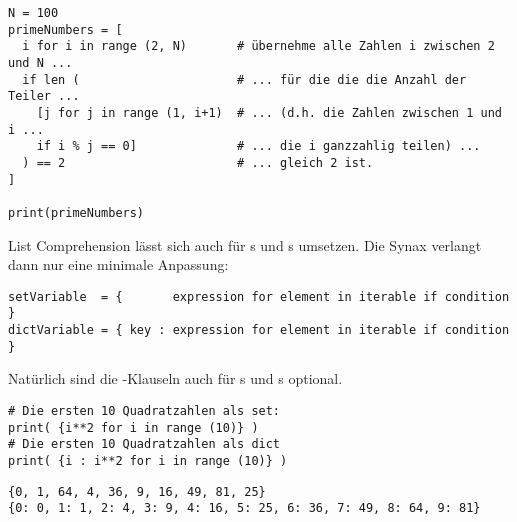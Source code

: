 \begin{codebox}
\begin{verbatim}
N = 100
primeNumbers = [
  i for i in range (2, N)       # übernehme alle Zahlen i zwischen 2 und N ...
  if len (                      # ... für die die die Anzahl der Teiler ...
    [j for j in range (1, i+1)  # ... (d.h. die Zahlen zwischen 1 und i ...
    if i % j == 0]              # ... die i ganzzahlig teilen) ...
  ) == 2                        # ... gleich 2 ist.
]

print(primeNumbers)
\end{verbatim}
\end{codebox}

\begin{cmdbox}
\end{cmdbox}


List Comprehension lässt sich auch für s und s umsetzen. Die Synax verlangt dann nur eine minimale Anpassung:
\begin{codebox}
\begin{verbatim}
setVariable  = {       expression for element in iterable if condition }
dictVariable = { key : expression for element in iterable if condition }
\end{verbatim}
\end{codebox}
Natürlich sind die -Klauseln auch für s und s optional.

\begin{codebox}
\begin{verbatim}
# Die ersten 10 Quadratzahlen als set:
print( {i**2 for i in range (10)} )
# Die ersten 10 Quadratzahlen als dict
print( {i : i**2 for i in range (10)} )
\end{verbatim}
\end{codebox}

\begin{cmdbox}
\begin{verbatim}
{0, 1, 64, 4, 36, 9, 16, 49, 81, 25}
{0: 0, 1: 1, 2: 4, 3: 9, 4: 16, 5: 25, 6: 36, 7: 49, 8: 64, 9: 81}
\end{verbatim}
\end{cmdbox}

